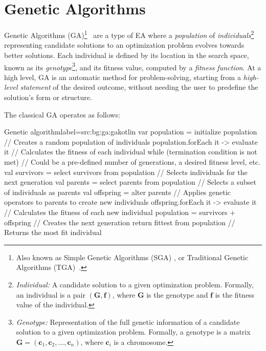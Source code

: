 \section{Genetic Algorithms}
\label{sec:bg:ga}
  Genetic Algorithms (GA)\footnote{
    Also known as Simple Genetic Algorithms (SGA) \autocite{yuIntroductionEvolutionaryAlgorithms2010}, or Traditional 
    Genetic Algorithms (TGA)~\autocite{shiffmanNatureCode2012}.
  }~\autocite{hollandAdaptationNaturalArtificial1992a,kozaGeneticProgrammingProgramming1992a,yuIntroductionEvolutionaryAlgorithms2010,shiffmanNatureCode2012}
  are a type of EA where a \emph{population} of \emph{individuals}\footnote{
    \emph{Individual:} A candidate solution to a given optimization problem. Formally, an individual is a pair \((\mathbf{G}, 
    \mathbf{f})\), where \(\mathbf{G}\) is the genotype and \(\mathbf{f}\) is the fitness value of the individual.
  } representing candidate solutions to an optimization problem evolves towards better solutions.
  Each individual is defined by its location in the search space, known as its \emph{genotype}\footnote{
    \emph{Genotype:} Representation of the full genetic information of a candidate solution to a given optimization problem. Formally, a 
    genotype is a matrix \(\mathbf{G} = (\textbf{c}_1, \textbf{c}_2, \dots, \textbf{c}_n)\), where \(\textbf{c}_i\) is a chromosome.
  }, and its fitness value, 
  computed by a \emph{fitness function}.
  At a high level, GA is an automatic method for problem-solving, starting from
  a \textit{high-level statement} of the desired outcome, without needing the
  user to predefine the solution's form or structure.

  The classical GA operates as follows:

  \begin{code}{Genetic algorithm}{label={src:bg:ga:ga}}{kotlin}
    var population = initialize population  // Creates a random population of individuals
    population.forEach { it -> evaluate it }  // Calculates the fitness of each individual
    while (termination condition is not met) {  // Could be a pre-defined number of generations, a desired fitness level, etc.
        val survivors = select survivors from population // Selects individuals for the next generation
        val parents = select parents from population // Selects a subset of individuals as parents
        val offspring = alter parents // Applies genetic operators to parents to create new individuals
        offspring.forEach { it -> evaluate it } // Calculates the fitness of each new individual
        population = survivors + offspring // Creates the next generation
    }
    return fittest from population  // Returns the most fit individual
  \end{code}

